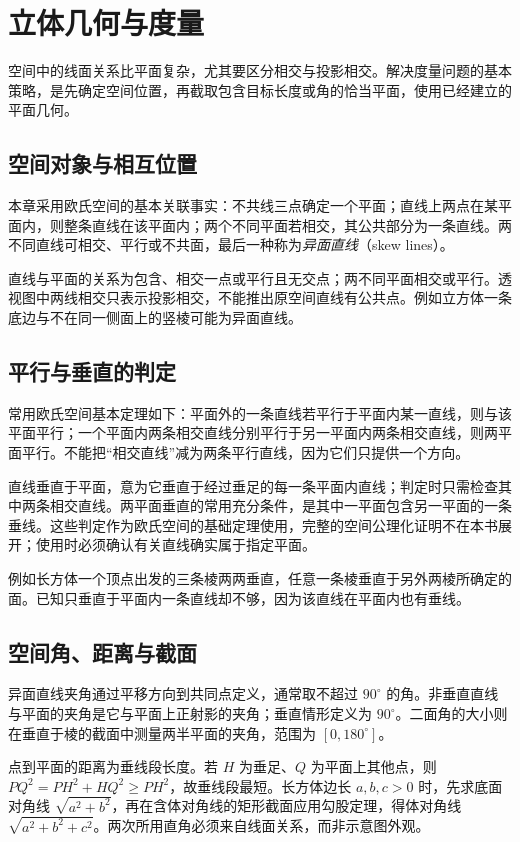\setcounter{chapter}{15} %
\chapter{立体几何与度量}
\label{chap:em-solid}
空间中的线面关系比平面复杂，尤其要区分相交与投影相交。解决度量问题的基本策略，是先确定空间位置，再截取包含目标长度或角的恰当平面，使用已经建立的平面几何。

\section{空间对象与相互位置}
本章采用欧氏空间的基本关联事实：不共线三点确定一个平面；直线上两点在某平面内，则整条直线在该平面内；两个不同平面若相交，其公共部分为一条直线。两不同直线可相交、平行或不共面，最后一种称为\emph{异面直线}（skew lines）。

直线与平面的关系为包含、相交一点或平行且无交点；两不同平面相交或平行。透视图中两线相交只表示投影相交，不能推出原空间直线有公共点。例如立方体一条底边与不在同一侧面上的竖棱可能为异面直线。

\section{平行与垂直的判定}
常用欧氏空间基本定理如下：平面外的一条直线若平行于平面内某一直线，则与该平面平行；一个平面内两条相交直线分别平行于另一平面内两条相交直线，则两平面平行。不能把“相交直线”减为两条平行直线，因为它们只提供一个方向。

直线垂直于平面，意为它垂直于经过垂足的每一条平面内直线；判定时只需检查其中两条相交直线。两平面垂直的常用充分条件，是其中一平面包含另一平面的一条垂线。这些判定作为欧氏空间的基础定理使用，完整的空间公理化证明不在本书展开；使用时必须确认有关直线确实属于指定平面。

例如长方体一个顶点出发的三条棱两两垂直，任意一条棱垂直于另外两棱所确定的面。已知只垂直于平面内一条直线却不够，因为该直线在平面内也有垂线。

\section{空间角、距离与截面}
异面直线夹角通过平移方向到共同点定义，通常取不超过 $90^\circ$ 的角。非垂直直线与平面的夹角是它与平面上正射影的夹角；垂直情形定义为 $90^\circ$。二面角的大小则在垂直于棱的截面中测量两半平面的夹角，范围为 $[0,180^\circ]$。

点到平面的距离为垂线段长度。若 $H$ 为垂足、$Q$ 为平面上其他点，则 $PQ^2=PH^2+HQ^2\ge PH^2$，故垂线段最短。长方体边长 $a,b,c>0$ 时，先求底面对角线 $\sqrt{a^2+b^2}$，再在含体对角线的矩形截面应用勾股定理，得体对角线 $\sqrt{a^2+b^2+c^2}$。两次所用直角必须来自线面关系，而非示意图外观。

